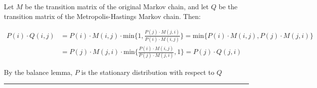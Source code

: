 \documentclass[twoside]{article}
\def\beginrefs{\begin{list}%
        {[\arabic{equation}]}{\usecounter{equation}
         \setlength{\leftmargin}{2.0truecm}\setlength{\labelsep}{0.4truecm}%
         \setlength{\labelwidth}{1.6truecm}}}
\def\endrefs{\end{list}}
\def\bibentry#1{\item[\hbox{[#1]}]}
\newenvironment{proof}{{\bf Proof:}}{\hfill\rule{2mm}{2mm}}
\begin{document}
\begin{proof}
Let $M$ be the transition matrix of the original Markov chain, and let $Q$ be the transition matrix of the Metropolis-Hastings Markov chain. Then:

\begin{equation*}
\begin{split}
P(i) \cdot Q(i,j)  & = P(i) \cdot M(i,j) \cdot \mbox{min}\{1, \frac{P(j) \cdot M(j,i)}{P(i) \cdot M(i,j)}\} = \mbox{min}\{P(i) \cdot M(i,j), P(j) \cdot M(j,i) \} \\
& = P(j) \cdot M(j,i) \cdot \mbox{min}\{\frac{P(i) \cdot M(i,j)}{P(j) \cdot M(j,i)}, 1 \} = P(j) \cdot Q(j, i)
\end{split}
\end{equation*}

By the balance lemma, $P$ is the stationary distribution with respect to $Q$
\end{proof}


\end{document}
